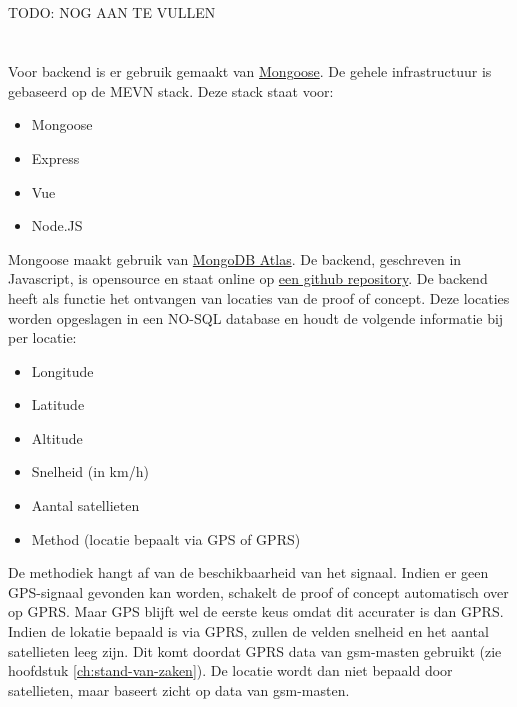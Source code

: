 \subsection{}
TODO: NOG AAN TE VULLEN
\pagebreak
\section{}
\label{ch:backend}

\subsection{}
Voor backend is er gebruik gemaakt van \href{https://mongoosejs.com/}{Mongoose}. De gehele infrastructuur is gebaseerd op de MEVN stack.
Deze stack staat voor:
\begin{itemize}
	\item Mongoose
	\item Express
	\item Vue
	\item Node.JS
\end{itemize}
Mongoose maakt gebruik van \href{https://www.mongodb.com/cloud/atlas}{MongoDB Atlas}. De backend, geschreven in Javascript, is opensource en staat online op \href{https://github.com/IndyVC/bap-backend}{een github repository}.
\newline
De backend heeft als functie het ontvangen van locaties van de proof of concept. Deze locaties worden opgeslagen in een NO-SQL database en houdt de volgende informatie bij per locatie:
\begin{itemize}
	\item Longitude
	\item Latitude
	\item Altitude
	\item Snelheid (in km/h)
	\item Aantal satellieten
	\item Method (locatie bepaalt via GPS of GPRS)
\end{itemize}
De methodiek hangt af van de beschikbaarheid van het signaal. Indien er geen GPS-signaal gevonden kan worden, schakelt de proof of concept automatisch over op GPRS. Maar GPS blijft wel de eerste keus omdat dit accurater is dan GPRS. Indien de lokatie bepaald is via GPRS, zullen de velden snelheid en het aantal satellieten leeg zijn. Dit komt doordat GPRS data van gsm-masten gebruikt (zie hoofdstuk \ref{ch:stand-van-zaken}). De locatie wordt dan niet bepaald door satellieten, maar baseert zicht op data van gsm-masten. 

